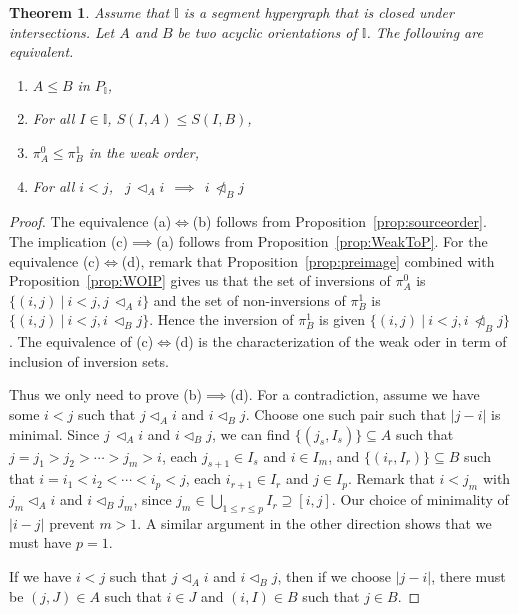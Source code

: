 \documentclass[reqno]{amsart}
\newtheorem{theorem}{Theorem}[section]
\theoremstyle{definition}
\newcommand{\less}{\vartriangleleft} %
\newcommand{\II}{\mathbb I} %
\begin{document}
\begin{theorem}\label{thm:propertieofintI}
Assume that $\II$ is a segment hypergraph that is closed under intersections. Let $A$ and $B$ be two acyclic orientations of $\II$.
The following are equivalent.
\begin{enumerate}
	\item[{\rm (a)}] $A\le B$ in $P_\II$,
	\item[{\rm (b)}]  For all $I\in\II$, $S(I,A)\le S(I,B)$,
	\item[{\rm (c)}]  $\pi^0_A \le \pi^1_B$ in the weak order,
	\item[{\rm (d)}]  For all $i<j$, \ $j\,\less_Ai \ \ \implies\ \  i \,\not\less_B j$
\end{enumerate}
\end{theorem}

\begin{proof} The equivalence (a)$\iff$(b) follows from Proposition~\ref{prop:sourceorder}. The implication (c)$\implies$(a) follows from  Proposition~\ref{prop:WeakToP}.
For the equivalence (c)$\iff$(d), remark that Proposition~\ref{prop:preimage} combined with Proposition~\ref{prop:WOIP} gives us that the set of inversions of $\pi^0_A$
is $\big\{(i,j)\ |\  i<j, j\,\less_Ai \big\}$ and the set of non-inversions of $\pi^1_B$ is  $\big\{(i,j)\ |\  i<j, i\,\less_B j \big\}$. Hence the inversion of $\pi^1_B$ is  given $\big\{(i,j)\ |\  i<j, i\,\not\less_B j \big\}$.
The equivalence of (c)$\iff$(d) is the characterization of the weak oder in term of inclusion of inversion sets.

Thus we only need to prove (b)$\implies$(d). For a contradiction, assume we have some $i<j$ such that $j\less_Ai$ and  $i \less_B j$. Choose one such pair such that $|j-i|$ is minimal.
Since $j\,\less_A i$ and $i \less_B j$, we can find
$\{(j_s,I_{s})\}\subseteq A$ such that $j=j_1>j_2>\cdots>j_m>i$, each $j_{s+1}\in I_s$ and $i\in I_m$, and 
$\{(i_r,I_{r})\}\subseteq B$ such that $i=i_1<i_2<\cdots<i_p<j$, each $i_{r+1}\in I_r$ and $j\in I_p$. Remark that $i<j_m$ with $j_m\less_A i$ and $i\less_B j_m$, since $j_m\in \bigcup_{1\le r\le p}I_r\supseteq [i,j]$.
Our choice of minimality of $|i-j|$ prevent $m>1$. A similar argument in the other direction shows that we must have $p=1$. 

If we have $i<j$ such that $j\less_Ai$ and  $i \less_B j$, then if we choose $|j-i|$, there must be $(j,J)\in A$ such that $i\in J$ and $(i,I)\in B$ such that $j\in B$.
\end{proof}
\end{document}
